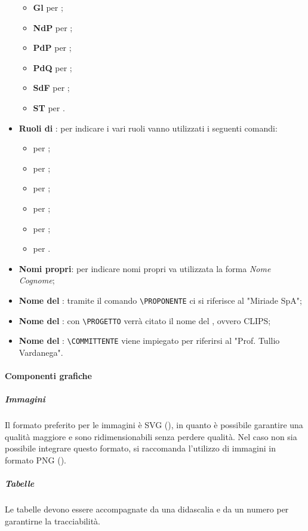 \begin{itemize}
\begin{itemize}
					\item \textbf{Gl} per \Gldoc;
					\item \textbf{NdP} per \NPdoc;
					\item \textbf{PdP} per \PPdoc;
					\item \textbf{PdQ} per \PQdoc;
					\item \textbf{SdF} per \SFdoc;
					\item \textbf{ST} per \STdoc.
				\end{itemize}	
				\item \textbf{Ruoli di }: per indicare i vari ruoli vanno utilizzati i seguenti comandi:
				\begin{itemize}
					\item {} per \AM;
					\item {} per \AN;
					\item {} per \PR;
					\item {} per \PRJ;
					\item {} per \RES;
					\item {} per \VER.
				\end{itemize}
				\item \textbf{Nomi propri}: per indicare nomi propri va utilizzata la forma \textit{Nome Cognome};
				\item \textbf{Nome del }: tramite il comando \texttt{\textbackslash PROPONENTE} ci si riferisce al  "Miriade SpA";
				\item \textbf{Nome del }: con \texttt{\textbackslash PROGETTO} verrà citato il nome del , ovvero CLIPS;
				\item \textbf{Nome del }: \texttt{\textbackslash COMMITTENTE} viene impiegato per riferirsi al "Prof. Tullio Vardanega".
			\end{itemize}
			
	\paragraph{Componenti grafiche}	
	\label{sec:3.1.2.3}	
		\subparagraph{Immagini}
		\label{sec:3.1.2.3.1}		
			Il formato preferito per le immagini è SVG (), in quanto è possibile garantire una qualità maggiore e sono ridimensionabili senza perdere qualità. Nel caso non sia possibile integrare questo formato, si raccomanda l'utilizzo di immagini in formato PNG ().
		\subparagraph{Tabelle}
		\label{sec:3.1.2.3.2}
			Le tabelle devono essere accompagnate da una didascalia e da un numero  per garantirne la tracciabilità.
		
